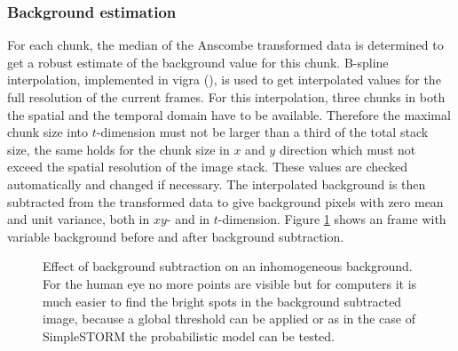 \subsubsection{Background estimation} \label{bgestimation}
For each chunk, the median of the Anscombe transformed data is determined to get a robust estimate of the background value for this chunk. 
B-spline interpolation, implemented in vigra (\cite{vigra}), is used to get interpolated values for the full resolution of the current frames. For this interpolation, three chunks in both the spatial and the temporal domain have to be available. Therefore the maximal chunk size into $t$-dimension must not be larger than a third of the total stack size, the same holds for the chunk size in $x$ and $y$ direction which must not exceed the spatial resolution of the image stack. These values are checked automatically and changed if necessary.\newline
The interpolated background is then subtracted from the transformed data to give background pixels with zero mean and unit variance, both in $xy$- and in $t$-dimension. Figure \ref{removedBG} shows an frame with variable background before and after background subtraction.
\begin{figure}
\hfill
{}
	\caption{Effect of background subtraction on an inhomogeneous background. For the human eye no more points are visible but for computers it is much easier to find the bright spots in the background subtracted image, because a global threshold can be applied or as in the case of SimpleSTORM the probabilistic model can be tested.}
	\label{removedBG}	
\end{figure}
